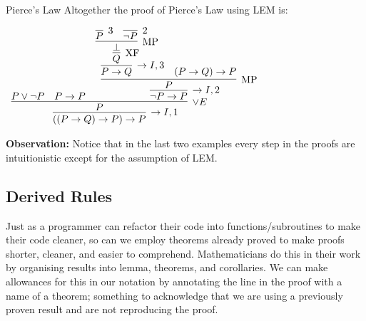 \documentclass{book}
\begin{document}
\begin{eg}{Pierce's Law}
        Altogether the proof of Pierce's Law using LEM is: 

        \begin{center}
            $\begin{array}{c}
                \infer[\to I,1]{((P \to Q) \to P) \to P}
                    {\infer[\lor E]{P}
                        {P \lor \lnot P
                        &
                        P \to P
                        &
                        \infer[\to I,2]{\lnot P \to P}
                            {\infer[\MP]{P}
                                {\infer[\to I,3]{P \to Q}
                                    {\infer[\XF]{Q}
                                        {\infer[\MP]{\bot}
                                            {\infer[3]{P}{}
                                            &
                                            \infer[2]{\lnot P}{}}}}
                                &
                                (P \to Q) \to P}}}}               
            \end{array}$
        \end{center}
    \end{eg}

    {\bf Observation:} Notice that in the last two examples every step in the proofs are intuitionistic except for the assumption of LEM. 

    \newpage
    \subsection*{Derived Rules}

    Just as a programmer can refactor their code into functions/subroutines to make their code cleaner, so can we employ theorems already proved to make proofs shorter, cleaner, and easier to comprehend. Mathematicians do this in their work by organising results into lemma, theorems, and corollaries. We can make allowances for this in our notation by annotating the line in the proof with a name of a theorem; something to acknowledge that we are using a previously proven result and are not reproducing the proof. 
\end{document}

